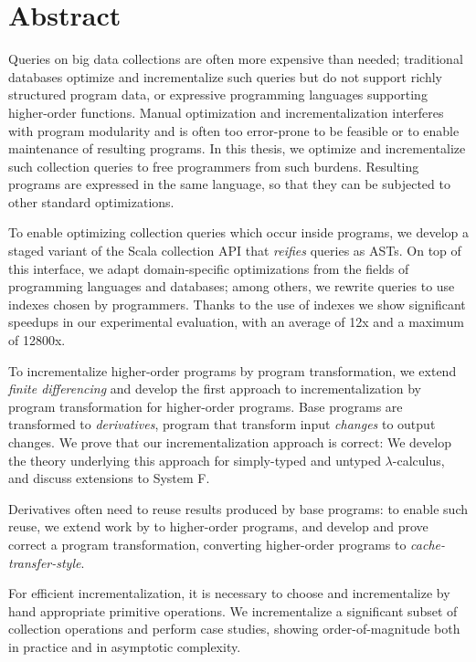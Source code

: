 \chapter{Abstract}

Queries on big data collections are often more expensive than needed;
traditional databases optimize and incrementalize such queries but do not
support richly structured program data, or expressive programming languages
supporting higher-order functions. Manual optimization and incrementalization
interferes with program modularity and is often too error-prone to be feasible
or to enable maintenance of resulting programs.
In this thesis, we optimize and incrementalize such collection queries to free
programmers from such burdens.
Resulting programs are expressed in the same language, so that they can be
subjected to other standard optimizations.

To enable optimizing collection queries which occur inside programs, we develop a
staged variant of the Scala collection API that \emph{reifies} queries as ASTs.
On top of this interface, we adapt domain-specific optimizations from the fields
of programming languages and databases; among others, we rewrite queries to use
indexes chosen by programmers. Thanks to the use of indexes we show significant
speedups in our experimental evaluation, with an average of 12x and a maximum of
12800x.

To incrementalize higher-order programs by program transformation, we extend
\emph{finite differencing} \citep{Paige82FDC,Blakeley:1986:EUM,Gupta99MMV} and
develop the first approach to incrementalization by program transformation for
higher-order programs. Base programs are transformed to \emph{derivatives},
program that transform input \emph{changes} to output changes.
We prove that our incrementalization approach is correct: We develop the theory
underlying this approach for simply-typed and untyped $\lambda$-calculus, and
discuss extensions to System F\@.

Derivatives often need to reuse results produced by base programs: to enable
such reuse, we extend work by \citet{Liu95} to higher-order programs, and
develop and prove correct a program transformation, converting higher-order
programs to \emph{cache-transfer-style}.

For efficient incrementalization, it is necessary to choose and incrementalize
by hand appropriate primitive operations. We incrementalize a significant subset
of collection operations and perform case studies, showing order-of-magnitude
both in practice and in asymptotic complexity.

